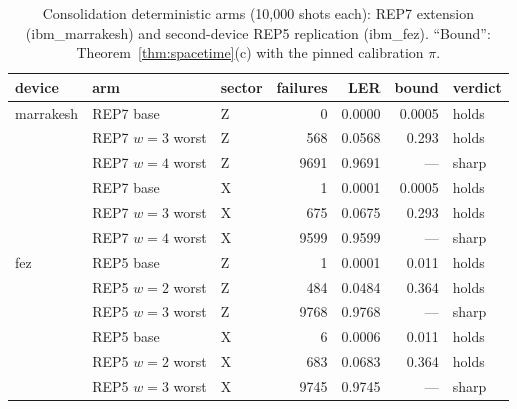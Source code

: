 \documentclass[11pt,a4paper]{article}
\begin{document}
\begin{table}[H]\centering\small
\caption{Consolidation deterministic arms (10{,}000 shots each): REP7
extension (ibm\_marrakesh) and second-device REP5 replication
(ibm\_fez). ``Bound'': Theorem~\ref{thm:spacetime}(c) with the pinned
calibration $\pi$.}
\label{tab:injrepl}
\begin{tabular}{@{}lllrrrl@{}}
\toprule
device & arm & sector & failures & LER & bound & verdict \\\midrule
marrakesh & REP7 base & Z & 0 & 0.0000 & 0.0005 & holds \\
 & REP7 $w{=}3$ worst & Z & 568 & 0.0568 & 0.293 & holds \\
 & REP7 $w{=}4$ worst & Z & 9691 & 0.9691 & --- & sharp \\
 & REP7 base & X & 1 & 0.0001 & 0.0005 & holds \\
 & REP7 $w{=}3$ worst & X & 675 & 0.0675 & 0.293 & holds \\
 & REP7 $w{=}4$ worst & X & 9599 & 0.9599 & --- & sharp \\\midrule
fez & REP5 base & Z & 1 & 0.0001 & 0.011 & holds \\
 & REP5 $w{=}2$ worst & Z & 484 & 0.0484 & 0.364 & holds \\
 & REP5 $w{=}3$ worst & Z & 9768 & 0.9768 & --- & sharp \\
 & REP5 base & X & 6 & 0.0006 & 0.011 & holds \\
 & REP5 $w{=}2$ worst & X & 683 & 0.0683 & 0.364 & holds \\
 & REP5 $w{=}3$ worst & X & 9745 & 0.9745 & --- & sharp \\\bottomrule
\end{tabular}
\end{table}
\end{document}
